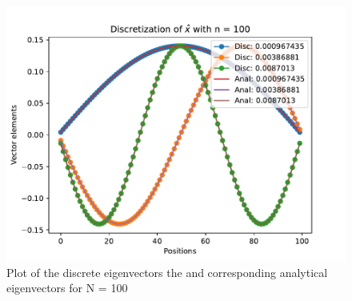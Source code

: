 \documentclass[english,notitlepage]{revtex4-1}  %
\begin{document}
\begin{figure}[H]
	\centering
	\includegraphics[scale=0.55]{plots/discretization_n100.pdf} %
	\caption{Plot of the discrete eigenvectors the and corresponding analytical eigenvectors for N = 100}
	\label{disc100}
\end{figure}
\end{document}
